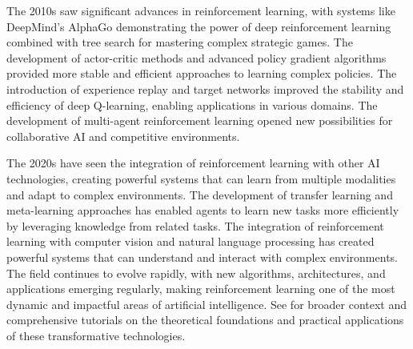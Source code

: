 The 2010s saw significant advances in reinforcement learning, with systems like DeepMind's AlphaGo demonstrating the power of deep reinforcement learning combined with tree search for mastering complex strategic games. The development of actor-critic methods and advanced policy gradient algorithms provided more stable and efficient approaches to learning complex policies. The introduction of experience replay and target networks improved the stability and efficiency of deep Q-learning, enabling applications in various domains. The development of multi-agent reinforcement learning opened new possibilities for collaborative AI and competitive environments.

The 2020s have seen the integration of reinforcement learning with other AI technologies, creating powerful systems that can learn from multiple modalities and adapt to complex environments. The development of transfer learning and meta-learning approaches has enabled agents to learn new tasks more efficiently by leveraging knowledge from related tasks. The integration of reinforcement learning with computer vision and natural language processing has created powerful systems that can understand and interact with complex environments. The field continues to evolve rapidly, with new algorithms, architectures, and applications emerging regularly, making reinforcement learning one of the most dynamic and impactful areas of artificial intelligence. See \textcite{Silver2016,Prince2023} for broader context and comprehensive tutorials on the theoretical foundations and practical applications of these transformative technologies.


